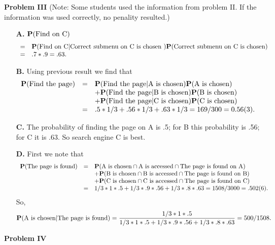 \documentclass[10pt]{article}
\def\Pr{{\bf P}}
\begin{document}
{\bf Problem III}
(Note: Some students used the information from problem II.  If the information was used correctly, no penality resulted.)
\begin{itemize}
\item[\bf A.] $\Pr(\mbox{Find on C})$
$$\begin{array}{rl}
=&\Pr(\mbox{Find on C}|\mbox{Correct submenu on C is chosen
})\Pr(\mbox{Correct submenu on C is chosen})\\=&.7*.9=.63.
\end{array}$$
\item[\bf B.] Using previous result we find that
$$\begin{array}{rcl}
\Pr(\mbox{Find the page})&=&\Pr(\mbox{Find the page}|\mbox{A is
chosen})\Pr(\mbox{A is chosen})\\ &&+\Pr(\mbox{Find the
page}|\mbox{B is chosen})\Pr(\mbox{B is chosen})\\
&&+\Pr(\mbox{Find the page}|\mbox{C is chosen})\Pr(\mbox{C is
chosen})\\ &=&.5*1/3+.56*1/3+.63*1/3=169/300 =0.56(3).
\end{array}$$
\item[\bf C.] The probability of finding the page on A is .5; for
B this probability is .56; for C it is .63. So search engine C is
best.
\item[\bf D.] First we note that
$$\begin{array}{rcl}
\Pr(\mbox{The page is found})&=& \Pr(\mbox{A is chosen}\cap\mbox{A
is accessed}\cap\mbox{The page is found on A})\\ &&+\Pr(\mbox{B is
chosen}\cap\mbox{B is accessed}\cap\mbox{The page is found on
B})\\ &&+\Pr(\mbox{C is chosen}\cap\mbox{C is
accessed}\cap\mbox{The page is found on C})\\ & =&
1/3*1*.5+1/3*.9*.56+1/3*.8*.63=1508/3000=.502(6).
\end{array}$$
So,
$$\Pr(\mbox{A is chosen}|\mbox{The page is
found})=\frac{1/3*1*.5}{1/3*1*.5+1/3*.9*.56+1/3*.8*.63}=500/1508.$$
\end{itemize}
{\bf Problem IV}
\end{document}
